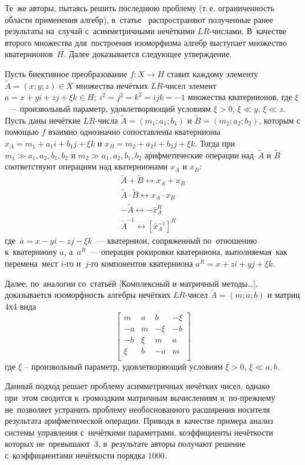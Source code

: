 Те~же авторы, пытаясь решить последнюю проблему (т.\,е. ограниченность области применения алгебр), в~статье~\cite{Uskov_Quaternion} распространяют полученные ранее результаты на~случай с~асимметричными нечёткими $LR$-числами. В~качестве второго множества для~построения изоморфизма алгебр выступает множество кватернионов~$H$. Далее доказывается следующее утверждение.
\begin{theorem}
Пусть биективное преобразование $f:X\to H$ ставит каждому элементу $\tilde{A}=\left( x;y;z \right)\in X$ множества нечётких $LR$-чисел элемент $a=x+yi+zj+\xi k\in H;\ {{i}^{2}}={{j}^{2}}={{k}^{2}}=ijk=-1$ множества кватернионов, где $\xi$~--– произвольный параметр, удовлетворяющий условиям $\xi >0$, $\xi \ll y$, $\xi \ll z$. Пусть даны нечёткие $LR$-числа $\tilde{A}=\left( {{m}_{1}};{{a}_{1}};{{b}_{1}} \right)$ и $\tilde{B}=\left( {{m}_{2}};{{a}_{2}};{{b}_{2}} \right)$, которым с помощью $f$ взаимно однозначно сопоставлены кватернионы ${{x}_{A}}={{m}_{1}}+{{a}_{1}}i+{{b}_{1}}j+\xi k$ и ${{x}_{B}}={{m}_{2}}+{{a}_{2}}i+{{b}_{2}}j+\xi k$. Тогда при~${{m}_{1}}\gg {{a}_{1}},{{a}_{2}},{{b}_{1}},{{b}_{2}}$ и ${{m}_{2}}\gg {{a}_{1}},{{a}_{2}},{{b}_{1}},{{b}_{2}}$ арифметические операции над~$\tilde A$ и $\tilde B$ соответствуют операциям над кватернионами ${{x}_{A}}$ и ${{x}_{B}}$:
\begin{gather*}
  \tilde{A}+\tilde{B}\leftrightarrow {{x}_{A}}+{{x}_{B}} \\ 
  \tilde{A}\cdot \tilde{B}\leftrightarrow {{x}_{A}}\cdot {{x}_{B}} \\ 
  -\tilde{A}\leftrightarrow -\bar{x}_{A}^{R} \\ 
  {{{\tilde{A}}}^{-1}}\leftrightarrow {{\left[ \bar{x}_{A}^{-1} \right]}^{R}}
\end{gather*}
где~$\bar a=x-yi-zj-\xi k$~--- кватернион, сопряженный по~отношению к~кватерниону $a$, а~${{a}^{R}}$~–-- операция рокировки кватерниона, выполняемая~как перемена~мест $i$-го и~$j$-го компонентов кватерниона $a^R=x+zi+yj+\xi k$.
\end{theorem}

Далее, по~аналогии со~статьёй [Комплексный и матричный методы…], доказывается изоморфность алгебры нечётких $LR$-чисел $\tilde{A}=\left( m;a;b \right)$ и матриц 4х4 вида
	\[\left[ \begin{matrix}
   m & a & b & -\xi   \\
   -a & m & -\xi  & -b  \\
   -b & \xi  & m & a  \\
   \xi  & b & -a & m  \\
\end{matrix} \right]\]
где $\xi $ – произвольный параметр, удовлетворяющий условиям $\xi>0$, $\xi \ll a,b$.

Данный подход решает проблему асимметричных нечётких чисел, однако при~этом сводится к~громоздким матричным вычислениям и~по-прежнему не~позволяет устранить проблему необоснованного расширения носителя результата арифметической операции. Приводя в~качестве примера анализ системы управления с~нечёткими параметрами, коэффициенты нечёткости которых не~превышают~$3$, в~результате авторы получают решение с~коэффициентами нечёткости порядка $1000$.